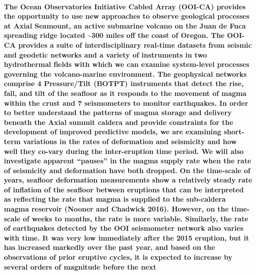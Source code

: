 \documentclass[11pt]{article}
\begin{document}
{\paragraph{The Ocean Observatories Initiative Cabled Array (OOI-CA)
provides the opportunity to use new approaches to observe geological
processes at Axial Seamount, an active submarine volcano on the Juan de
Fuca spreading ridge located \textasciitilde{}300 miles off the coast of
Oregon. The OOI-CA provides a suite of interdisciplinary real-time
datasets from seismic and geodetic networks and a variety of instruments
in two hydrothermal fields with which we can examine system-level
processes governing the volcano-marine environment. The geophysical
networks comprise 4 Pressure/Tilt (BOTPT) instruments that detect the
rise, fall, and tilt of the seafloor as it responds to the movement of
magma within the crust and 7 seismometers to monitor earthquakes. In
order to better understand the patterns of magma storage and delivery
beneath the Axial summit caldera and provide constraints for the
development of improved predictive models, we are examining short-term
variations in the rates of deformation and seismicity and how well they
co-vary during the inter-eruption time period. We will also investigate
apparent ``pauses'' in the magma supply rate when the rate of seismicity
and deformation have both dropped. On the time-scale of years, seafloor
deformation measurements show a relatively steady rate of inflation of
the seafloor between eruptions that can be interpreted as reflecting the
rate that magma is supplied to the sub-caldera magma reservoir (Nooner
and Chadwick 2016). However, on the time-scale of weeks to months, the
rate is more variable. Similarly, the rate of earthquakes detected by
the OOI seismometer network also varies with time. It was very low
immediately after the 2015 eruption, but it has increased markedly over
the past year, and based on the observations of prior eruptive cycles,
it is expected to increase by several orders of magnitude before the
next
}}
\end{document}
